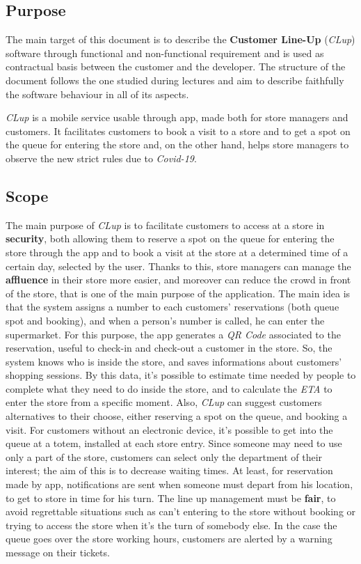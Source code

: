 \documentclass{article}
\begin{document}
	\subsection{Purpose}
	
	The main target of this document is to describe the {\bfseries Customer Line-Up} (\emph{CLup}) software through functional and non-functional requirement and is used as contractual basis between the customer and the developer. The structure of the document follows the one studied during lectures and aim to describe faithfully the software behaviour in all of its aspects.
	
	\emph{CLup} is a mobile service usable through app, made both for store managers and customers. It facilitates customers to book a visit to a store and to get a spot on the queue for entering the store and, on the other hand, helps store managers to observe the new strict rules due to \emph{Covid-19}.
	
	\subsection{Scope}
	
	The main purpose of \emph{CLup} is to facilitate customers to access at a store in {\bfseries security}, both allowing them to reserve a spot on the queue for entering the store through the app and to book a visit at the store at a determined time of a certain day, selected by the user. Thanks to this, store managers can manage the {\bfseries affluence} in their store more easier, and moreover can reduce the crowd in front of the store, that is one of the main purpose of the application. The main idea is that the system assigns a number to each customers' reservations (both queue spot and booking), and when a person's number is called, he can enter the supermarket. For this purpose, the app generates a \emph{QR Code} associated to the reservation, useful to check-in and check-out a customer in the store. So, the system knows who is inside the store, and saves informations about customers' shopping sessions. By this data, it's possible to estimate time needed by people to complete what they need to do inside the store, and to calculate the \emph{ETA} to enter the store from a specific moment. Also, \emph{CLup} can suggest customers alternatives to their choose, either reserving a spot on the queue, and booking a visit. For customers without an electronic device, it's possible to get into the queue at a totem, installed at each store entry. Since someone may need to use only a part of the store, customers can select only the department of their interest; the aim of this is to decrease waiting times. At least, for reservation made by app, notifications are sent when someone must depart from his location, to get to store in time for his turn. The line up management must be {\bfseries fair}, to avoid regrettable situations such as can't entering to the store without booking or trying to access the store when it's the turn of somebody else. In the case the queue goes over the store working hours, customers are alerted by a warning message on their tickets.
\end{document}
